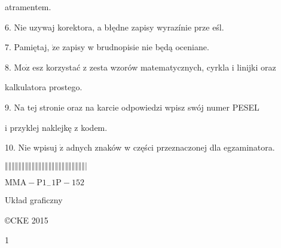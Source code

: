 \documentclass[a4paper,12pt]{article}
\begin{document}
atramentem.

6. Nie uzywaj korektora, a błędne zapisy wyrazínie prze eśl.

7. Pamiętaj, $\dot{\mathrm{z}}\mathrm{e}$ zapisy w brudnopisie nie będą oceniane.

8. $\mathrm{M}\mathrm{o}\dot{\mathrm{z}}$ esz korzystać z zesta wzorów matematycznych, cyrkla i linijki oraz

kalkulatora prostego.

9. Na tej stronie oraz na karcie odpowiedzi wpisz swój numer PESEL

i przyklej naklejkę z kodem.

10. Nie wpisuj $\dot{\mathrm{z}}$ adnych znaków w części przeznaczonej dla egzaminatora.

$\Vert\Vert\Vert\Vert\Vert\Vert\Vert\Vert\Vert\Vert\Vert\Vert\Vert\Vert\Vert\Vert\Vert\Vert\Vert\Vert\Vert\Vert\Vert\Vert|$

$\mathrm{M}\mathrm{M}\mathrm{A}-\mathrm{P}1_{-}1\mathrm{P}-152$

Układ graficzny

\copyright CKE 2015

1
\end{document}

